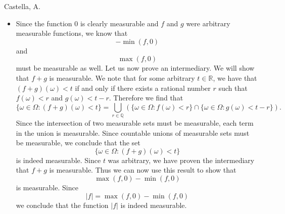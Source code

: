 \begin{solution}[5.4]{Castella, A.}
\begin{itemize}
        $$
            -\max(-f,-g)
        $$
        must be measurable as well. Finally we note that
        $$
            \min(f,g) = -\max(-f,-g),
        $$
        which implies that $\min(f,g)$ is a measurable function.
        \item Since the function $0$ is clearly measurable and $f$ and $g$ were arbitrary measurable functions, we know that
        $$
            -\min(f,0)
        $$
        and
        $$
            \max(f,0)
        $$
        must be measurable as well. Let us now prove an intermediary. We will show that $f+g$ is measurable. We note that for some arbitrary $t \in \mathbb{R}$, we have that $(f+g)(\omega) < t$ if and only if there exists a rational number $r$ such that $f(\omega) < r$ and $g(\omega) < t-r$. Therefore we find that
        $$
            \{\omega \in \Omega : (f+g)(\omega) < t\} = \bigcup_{r\in\mathbb{Q}}\left(\{\omega \in \Omega : f(\omega) < r\}\cap \{\omega \in \Omega : g(\omega) < t-r\}\right).
        $$
        Since the intersection of two measurable sets must be measurable, each term in the union is measurable. Since countable unions of measurable sets must be measurable, we conclude that the set
        $$
            \{\omega \in \Omega : (f+g)(\omega) < t\}
        $$
        is indeed measurable. Since $t$ was arbitrary, we have proven the intermediary that $f+g$ is measurable. Thus we can now use this result to show that
        $$
            \max(f,0) - \min(f,0)
        $$
        is measurable. Since
        $$
            |f| = \max(f,0) - \min(f,0)
        $$
        we conclude that the function $|f|$ is indeed measurable.
    \end{itemize}
\end{solution}

